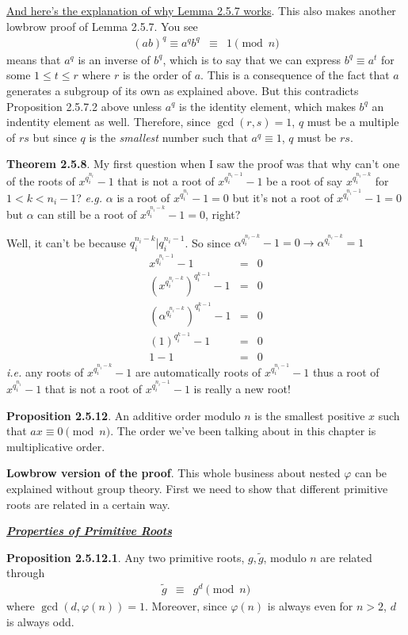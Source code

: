 \documentclass[aps,preprint,preprintnumbers,nofootinbib,showpacs,prd]{revtex4-1}
\newcommand{\ie}{{\it i.e.} }
\newcommand{\eg}{{\it e.g.} }
\newcommand{\nbea}{\begin{eqnarray*}}
\newcommand{\neea}{\end{eqnarray*}}
\begin{document}
\underline{And here's the explanation of why Lemma 2.5.7 works}. This also makes another lowbrow proof of Lemma 2.5.7. You see
%
\nbea
(ab)^q \equiv a^q b^q & \equiv & 1 \pmod{n}
\neea
%
means that $a^q$ is an inverse of $b^q$, which is to say that we can express $b^q \equiv a^t$ for some $1 \le t \le r$ where $r$ is the order of $a$. This is a consequence of the fact that $a$ generates a subgroup of its own as explained above. But this contradicts Proposition 2.5.7.2 above unless $a^q$ is the identity element, which makes $b^q$ an indentity element as well. Therefore, since $\gcd(r,s) = 1$, $q$ must be a multiple of $rs$ but since $q$ is the {\it smallest} number such that $a^q \equiv 1$, $q$ must be $rs$.

{\bf Theorem 2.5.8}. My first question when I saw the proof was that why can't one of the roots of $x^{q_i^{n_i}} - 1$ that is not a root of $x^{q_i^{n_i - 1}} - 1$ be a root of say $x^{q_i^{n_i - k}}$ for $1 < k < n_i - 1$? \eg $\alpha$ is a root of $x^{q_i^{n_i}} - 1 = 0$ but it's not a root of $x^{q_i^{n_i - 1}} - 1 = 0$ but $\alpha$ can still be a root of $x^{q_i^{n_i - k}} -1 = 0$, right?

Well, it can't be because $q_i^{n_i - k} | q_i^{n_i-1}$. So since $\alpha^{q_i^{n_i - k}} -1 = 0 \to \alpha^{q_i^{n_i - k}} = 1$
%
\nbea
x^{q_i^{n_i-1}} - 1 & = & 0 \\
\left (x^{q_i^{n_i-k}} \right )^{q_i^{k-1}} - 1 & = & 0 \\
\left (\alpha^{q_i^{n_i-k}} \right )^{q_i^{k-1}} - 1 & = & 0 \\
\left (1 \right )^{q_i^{k-1}} - 1 & = & 0 \\
1-1 & = & 0
\neea
%
\ie any roots of $x^{q_i^{n_i - k}} - 1$ are automatically roots of $x^{q_i^{n_i - 1}} - 1$ thus a root of $x^{q_i^{n_i}} - 1$ that is not a root of $x^{q_i^{n_i - 1}} - 1$ is really a new root!

{\bf Proposition 2.5.12}. An additive order modulo $n$ is the smallest positive $x$ such that $ax \equiv 0 \pmod{n}$. The order we've been talking about in this chapter is multiplicative order.

{\bf Lowbrow version of the proof}. This whole business about nested $\varphi$ can be explained without group theory. First we need to show that different primitive roots are related in a certain way.

\bigskip
\underline{\textbf{\textit{Properties of Primitive Roots}}}
\bigskip

{\bf Proposition 2.5.12.1}. Any two primitive roots, $g, \tilde g$, modulo $n$ are related through
%
\nbea
\tilde g & \equiv & g^{d} \pmod{n}
\neea
%
where $\gcd(d, \varphi(n)) = 1$. Moreover, since $\varphi(n)$ is always even for $n > 2$, $d$ is always odd.
\end{document}
